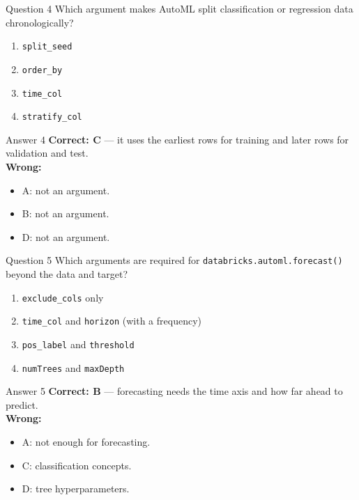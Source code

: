 \documentclass[aspectratio=169,11pt]{beamer}
\begin{document}
\begin{frame}{Question 4}
Which argument makes AutoML split classification or regression data chronologically?
\begin{enumerate}[label=\Alph*.]
\item \texttt{split\_seed}
\item \texttt{order\_by}
\item \texttt{time\_col}
\item \texttt{stratify\_col}
\end{enumerate}
\end{frame}
\begin{frame}{Answer 4}
\textbf{Correct: C} --- it uses the earliest rows for training and later rows for validation and test.\\
\vspace{0.5em}
\textbf{Wrong:}
\begin{itemize}
\item A: not an argument.
\item B: not an argument.
\item D: not an argument.
\end{itemize}
\end{frame}

\begin{frame}{Question 5}
Which arguments are required for \texttt{databricks.automl.forecast()} beyond the data and target?
\begin{enumerate}[label=\Alph*.]
\item \texttt{exclude\_cols} only
\item \texttt{time\_col} and \texttt{horizon} (with a frequency)
\item \texttt{pos\_label} and \texttt{threshold}
\item \texttt{numTrees} and \texttt{maxDepth}
\end{enumerate}
\end{frame}
\begin{frame}{Answer 5}
\textbf{Correct: B} --- forecasting needs the time axis and how far ahead to predict.\\
\vspace{0.5em}
\textbf{Wrong:}
\begin{itemize}
\item A: not enough for forecasting.
\item C: classification concepts.
\item D: tree hyperparameters.
\end{itemize}
\end{frame}
\end{document}
